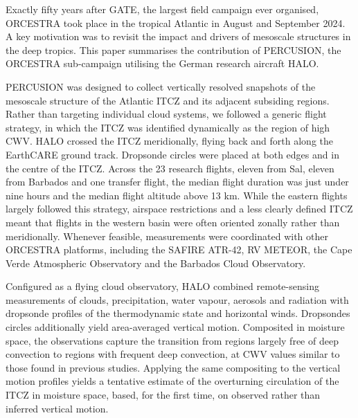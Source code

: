 \documentclass[acp, manuscript]{copernicus}
\begin{document}
\conclusions
\label{sec:conclusion}

Exactly fifty years after GATE, the largest field campaign ever organised, ORCESTRA took place in the tropical Atlantic in August and September 2024. A key motivation was to revisit the impact and drivers of mesoscale structures in the deep tropics. This paper summarises the contribution of PERCUSION, the ORCESTRA sub-campaign utilising the German research aircraft HALO.

PERCUSION was designed to collect vertically resolved snapshots of the mesoscale structure of the Atlantic ITCZ and its adjacent subsiding regions. Rather than targeting individual cloud systems, we followed a generic flight strategy, in which the ITCZ was identified dynamically as the region of high CWV. HALO crossed the ITCZ meridionally, flying back and forth along the EarthCARE ground track. Dropsonde circles were placed at both edges and in the centre of the ITCZ. Across the 23 research flights, eleven from Sal, eleven from Barbados and one transfer flight, the median flight duration was just under nine hours and the median flight altitude above 13 km. While the eastern flights largely followed this strategy, airspace restrictions and a less clearly defined ITCZ meant that flights in the western basin were often oriented zonally rather than meridionally. Whenever feasible, measurements were coordinated with other ORCESTRA platforms, including the SAFIRE ATR-42, RV METEOR, the Cape Verde Atmospheric Observatory and the Barbados Cloud Observatory.

Configured as a flying cloud observatory, HALO combined remote-sensing measurements of clouds, precipitation, water vapour, aerosols and radiation with dropsonde profiles of the thermodynamic state and horizontal winds. Dropsondes circles additionally yield area-averaged vertical motion. Composited in moisture space, the observations capture the transition from regions largely free of deep convection to regions with frequent deep convection, at CWV values similar to those found in previous studies. Applying the same compositing to the vertical motion profiles yields a tentative estimate of the overturning circulation of the ITCZ in moisture space, based, for the first time, on observed rather than inferred vertical motion.
\end{document}
